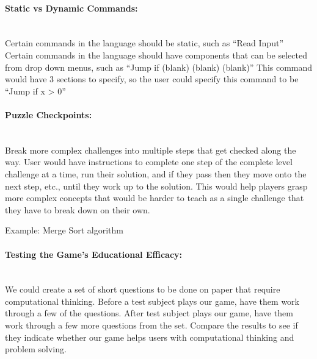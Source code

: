 \paragraph{Static vs Dynamic Commands:} ~\\
Certain commands in the language should be static, such as “Read Input”
Certain commands in the language should have components that can be selected from drop down menus, such as “Jump if (blank) (blank) (blank)”
  This command would have 3 sections to specify, so the user could specify this command to be “Jump if x > 0”


\paragraph{Puzzle Checkpoints:} ~\\
Break more complex challenges into multiple steps that get checked along the way.
User would have instructions to complete one step of the complete level challenge at a time, run their solution, and if they pass then they move onto the next step, etc., until they work up to the solution.
This would help players grasp more complex concepts that would be harder to teach as a single challenge that they have to break down on their own.

Example: Merge Sort algorithm

\hspace{10mm} 

\hspace{10mm} 

\hspace{10mm} 

\hspace{10mm} 


\paragraph{Testing the Game's Educational Efficacy:} ~\\
We could create a set of short questions to be done on paper that require computational thinking.
Before a test subject plays our game, have them work through a few of the questions.
After test subject plays our game, have them work through a few more questions from the set.
Compare the results to see if they indicate whether our game helps users with computational thinking and problem solving.

